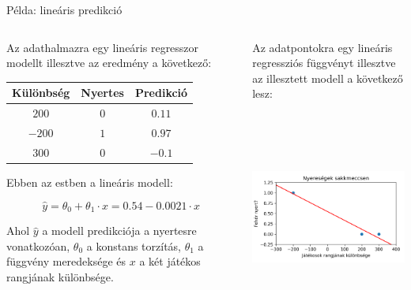 \documentclass[english, aspectratio=169]{beamer}
\begin{document}
\begin{frame}{Példa: lineáris predikció}
\begin{columns}
\begin{column}{.5\textwidth}
Az adathalmazra egy lineáris regresszor modellt illesztve az eredmény a következő:\par\smallskip
\begin{center}
\begin{tabular}{|c|c|c|}
\hline
Különbség & Nyertes & Predikció\\
\hline
$200$ & $0$ & $0.11$\\
\hline
$-200$ & $1$ & $0.97$\\
\hline
$300$ & $0$ & $-0.1$\\
\hline
\end{tabular}
\par\medskip
\end{center}
Ebben az estben a lineáris modell:
\begin{block}{}
\vspace{-0.6cm}
\[
\hat{y} = \theta_0 + \theta_1 \cdot x = 0.54 - 0.0021 \cdot x
\]
\end{block}
Ahol $\hat{y}$ a modell predikciója a nyertesre vonatkozóan, $\theta_0$ a konstans torzítás, $\theta_1$ a függvény meredeksége és $x$ a két játékos rangjának különbsége.
\end{column}
\begin{column}{.5\textwidth}
Az adatpontokra egy lineáris regressziós függvényt illesztve az illesztett modell a következő lesz:\par\smallskip
\begin{center}
\includegraphics[width=7cm, height=7cm, keepaspectratio]{images/osztalyozas_13.png}
\end{center}
\end{column}
\end{columns}
\end{frame}
\end{document}
